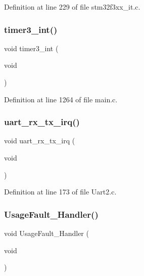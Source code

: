 Definition at line 229 of file stm32f3xx\+\_\+it.\+c.

\mbox{\label{group___c_a_n___networking_gac8b7887130674b2ae32a9806dba0f0c9}} 
\subsubsection{timer3\+\_\+int()}
{\footnotesize\ttfamily void timer3\+\_\+int (\begin{DoxyParamCaption}\item[{void}]{ }\end{DoxyParamCaption})}



Definition at line 1264 of file main.\+c.

\mbox{\label{group___c_a_n___networking_ga8ef2537340ebd298d432f1bad2af424f}} 
\subsubsection{uart\+\_\+rx\+\_\+tx\+\_\+irq()}
{\footnotesize\ttfamily void uart\+\_\+rx\+\_\+tx\+\_\+irq (\begin{DoxyParamCaption}\item[{void}]{ }\end{DoxyParamCaption})}



Definition at line 173 of file Uart2.\+c.

\mbox{\label{group___c_a_n___networking_ga1d98923de2ed6b7309b66f9ba2971647}} 
\subsubsection{Usage\+Fault\+\_\+\+Handler()}
{\footnotesize\ttfamily void Usage\+Fault\+\_\+\+Handler (\begin{DoxyParamCaption}\item[{void}]{ }\end{DoxyParamCaption})}



